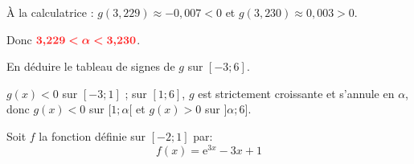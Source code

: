 \documentclass[11pt,a4paper]{article}  %
\begin{document}
\begin{enumMet}
\begin{corrBox}
			\medskip
			À la calculatrice : $g(3{,}229)\approx-0{,}007<0$ et $g(3{,}230)\approx0{,}003>0$.
			
			Donc $\mRouge{3{,}229<\alpha<3{,}230}$.
		\end{corrBox}
		
		\item En déduire le tableau de signes de $g$ sur $[-3 ; 6]$.
		
		\begin{corrBox}
			$g(x)<0$ sur $[-3;1]$ ; sur $[1;6]$, $g$ est strictement croissante et s'annule en $\alpha$, donc $g(x)<0$ sur $[1;\alpha[$ et $g(x)>0$ sur $]\alpha;6]$.
			
			\begin{center}
			\end{center}
		\end{corrBox}
	\end{enumMet}
	
	\exerciceDS{}
	
	Soit $f$ la fonction définie sur $[-2 ; 1]$ par:
	$$
	f(x)=\mathrm{e}^{3 x}-3 x+1
	$$
	
\end{document}

